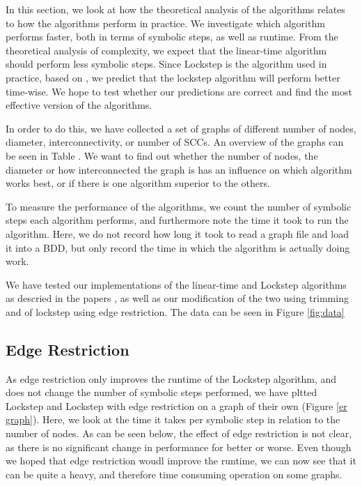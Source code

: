 \documentclass[../master/master.tex]{subfiles}
\begin{document}

In this section, we look at how the theoretical analysis of the algorithms relates to how the algorithms perform in practice. We investigate which algorithm performs faster, both in terms of symbolic steps, as well as runtime. From the theoretical analysis of complexity, we expect that the linear-time algorithm should perform less symbolic steps. Since Lockstep is the algorithm used in practice, based on , we predict that the lockstep algorithm will perform better time-wise. We hope to test whether our predictions are correct and find the most effective version of the algorithms.

In order to do this, we have collected a set of graphs of different number of nodes, diameter, interconnectivity, or number of SCCs. An overview of the graphs can be seen in Table . We want to find out whether the number of nodes, the diameter or how interconnected the graph is has an influence on which algorithm works best, or if there is one algorithm superior to the others.

To measure the performance of the algorithms, we count the number of symbolic steps each algorithm performs, and furthermore note the time it took to run the algorithm. Here, we do not record how long it took to read a graph file and load it into a BDD, but only record the time in which the algorithm is actually doing work.

We have tested our implementations of the linear-time and Lockstep algorithms as descried in the papers \cite{linear}\cite{lockstep}, as well as our modification of the two using trimming and of lockstep using edge restriction. The data can be seen in Figure \ref{fig:data}

\subsection{Edge Restriction}
As edge restriction only improves the runtime of the Lockstep algorithm, and does not change the number of symbolic steps performed, we have pltted Lockstep and Lockstep with edge restriction on a graph of their own (Figure \ref{er graph}). Here, we look at the time it takes per symbolic step in relation to the number of nodes. As can be seen below, the effect of edge restriction is not clear, as there is no significant change in performance for better or worse. Even though we hoped that edge restriction woudl improve the runtime, we can now see that it can be quite a heavy, and therefore time consuming operation on some graphs.
\end{document}
